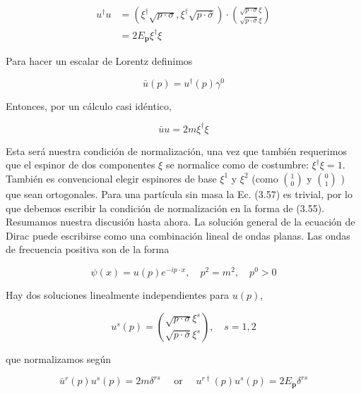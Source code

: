 \begin{align*}
u^{\dagger} u & =\left(\xi^{\dagger} \sqrt{p \cdot \sigma}, \xi^{\dagger} \sqrt{p \cdot \bar{\sigma}}\right) \cdot\binom{\sqrt{p \cdot \sigma} \xi}{\sqrt{p \cdot \bar{\sigma}} \xi}  \tag{3.55}\\
& =2 E_{\mathbf{p}} \xi^{\dagger} \xi
\end{align*}


Para hacer un escalar de Lorentz definimos

\begin{equation*}
\bar{u}(p)=u^{\dagger}(p) \gamma^{0} \tag{3.56}
\end{equation*}


Entonces, por un cálculo casi idéntico,

\begin{equation*}
\bar{u} u=2 m \xi^{\dagger} \xi \tag{3.57}
\end{equation*}

Esta será nuestra condición de normalización, una vez que también requerimos que el espinor de dos componentes $\xi$ se normalice como de costumbre: $\xi^{\dagger} \xi=1$. También es convencional elegir espinores de base $\xi^{1}$ y $\xi^{2}$ (como $\binom{1}{0}$ y $\binom{0}{1}$ ) que sean ortogonales. Para una partícula sin masa la Ec. (3.57) es trivial, por lo que debemos escribir la condición de normalización en la forma de (3.55). Resumamos nuestra discusión hasta ahora. La solución general de la ecuación de Dirac puede escribirse como una combinación lineal de ondas planas. Las ondas de frecuencia positiva son de la forma

\begin{equation*}
\psi(x)=u(p) e^{-i p \cdot x}, \quad p^{2}=m^{2}, \quad p^{0}>0 \tag{3.58}
\end{equation*}


Hay dos soluciones linealmente independientes para $u(p)$,

\begin{equation*}
u^{s}(p)=\binom{\sqrt{p \cdot \sigma} \xi^{s}}{\sqrt{p \cdot \bar{\sigma}} \xi^{s}}, \quad s=1,2 \tag{3.59}
\end{equation*}

que normalizamos según

\begin{equation*}
\bar{u}^{r}(p) u^{s}(p)=2 m \delta^{r s} \quad \text { or } \quad u^{r \dagger}(p) u^{s}(p)=2 E_{\mathbf{p}} \delta^{r s} \tag{3.60}
\end{equation*}




